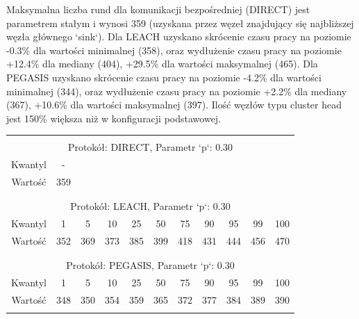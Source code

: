 \documentclass[a4paper,12pt,twoside,openany]{report}
\begin{document}
\par
Maksymalna liczba rund dla komunikacji bezpośredniej (DIRECT) jest parametrem stałym i wynosi 359 (uzyskana przez węzeł znajdujący się najbliższej węzła głównego `sink`).
Dla LEACH uzyskano skrócenie czasu pracy na poziomie -0.3\% dla wartości minimalnej (358), oraz wydłużenie czasu pracy na poziomie +12.4\% dla mediany (404), +29.5\% dla wartości maksymalnej (465).
Dla PEGASIS uzyskano skrócenie czasu pracy na poziomie -4.2\% dla wartości minimalnej (344), oraz wydłużenie czasu pracy na poziomie +2.2\% dla mediany (367), +10.6\% dla wartości maksymalnej (397).
Ilość węzłów typu cluster head jest 150\% większa niż w konfiguracji podstawowej.

\begin{longtable}{*{11}{c}}
\toprule \\*
\multicolumn{11}{c}{Protokół: DIRECT, Parametr `p`: 0.30} \\*
Kwantyl	& -	\\*
Wartość	& 359	\\*
\midrule \\*
\\*
\multicolumn{11}{c}{Protokół: LEACH, Parametr `p`: 0.30} \\*
Kwantyl	& 1	& 5	& 10	& 25	& 50	& 75	& 90	& 95	& 99	& 100	\\*
Wartość	& 352	& 369	& 373	& 385	& 399	& 418	& 431	& 444	& 456	& 470	\\*
\midrule \\*
\\*
\multicolumn{11}{c}{Protokół: PEGASIS, Parametr `p`: 0.30} \\*
Kwantyl	& 1	& 5	& 10	& 25	& 50	& 75	& 90	& 95	& 99	& 100	\\*
Wartość	& 348	& 350	& 354	& 359	& 365	& 372	& 377	& 384	& 389	& 390	\\*	
\bottomrule \\*
\end{longtable}
\end{document}
